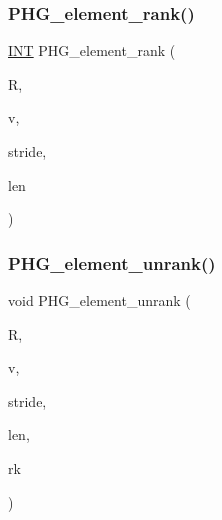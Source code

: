 \mbox{\label{projective_8_c_a213af66cf8062194c881a477590e9ad6}} 
\subsubsection{\texorpdfstring{P\+H\+G\+\_\+element\+\_\+rank()}{PHG\_element\_rank()}}
{\footnotesize\ttfamily \mbox{\hyperlink{galois_8h_a09fddde158a3a20bd2dcadb609de11dc}{I\+NT}} P\+H\+G\+\_\+element\+\_\+rank (\begin{DoxyParamCaption}\item[{\mbox{\hyperlink{classfinite__ring}{finite\+\_\+ring}} \&}]{R,  }\item[{\mbox{\hyperlink{galois_8h_a09fddde158a3a20bd2dcadb609de11dc}{I\+NT}} $\ast$}]{v,  }\item[{\mbox{\hyperlink{galois_8h_a09fddde158a3a20bd2dcadb609de11dc}{I\+NT}}}]{stride,  }\item[{\mbox{\hyperlink{galois_8h_a09fddde158a3a20bd2dcadb609de11dc}{I\+NT}}}]{len }\end{DoxyParamCaption})}

\mbox{\label{projective_8_c_a28a4e5897e3ecf19ab06209af619e889}} 
\subsubsection{\texorpdfstring{P\+H\+G\+\_\+element\+\_\+unrank()}{PHG\_element\_unrank()}}
{\footnotesize\ttfamily void P\+H\+G\+\_\+element\+\_\+unrank (\begin{DoxyParamCaption}\item[{\mbox{\hyperlink{classfinite__ring}{finite\+\_\+ring}} \&}]{R,  }\item[{\mbox{\hyperlink{galois_8h_a09fddde158a3a20bd2dcadb609de11dc}{I\+NT}} $\ast$}]{v,  }\item[{\mbox{\hyperlink{galois_8h_a09fddde158a3a20bd2dcadb609de11dc}{I\+NT}}}]{stride,  }\item[{\mbox{\hyperlink{galois_8h_a09fddde158a3a20bd2dcadb609de11dc}{I\+NT}}}]{len,  }\item[{\mbox{\hyperlink{galois_8h_a09fddde158a3a20bd2dcadb609de11dc}{I\+NT}}}]{rk }\end{DoxyParamCaption})}

